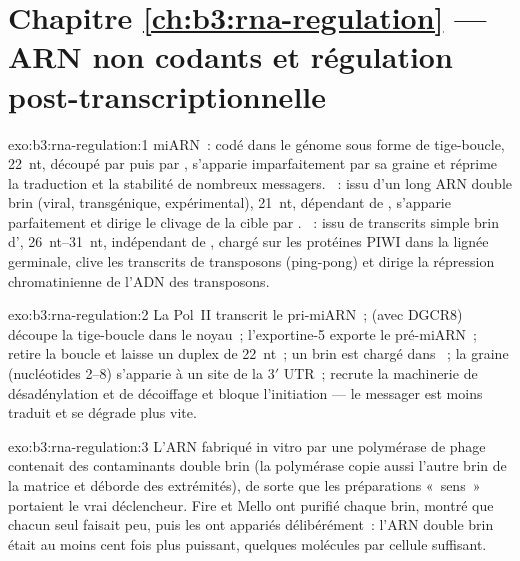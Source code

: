 \section*{Chapitre \ref{ch:b3:rna-regulation} --- ARN non codants et régulation post-transcriptionnelle}

\begin{solution}{exo:b3:rna-regulation:1}
miARN~: codé dans le génome sous forme de tige-boucle, \qty{22}{nt},
découpé par  puis par , s'apparie imparfaitement par sa
graine et réprime la traduction et la stabilité de nombreux messagers.
~: issu d'un long ARN double brin (viral, transgénique,
expérimental), \qty{21}{nt}, dépendant de , s'apparie parfaitement
et dirige le clivage de la cible par . ~: issu de
transcrits simple brin d', \qtyrange{26}{31}{nt},
indépendant de , chargé sur les protéines PIWI dans la lignée
germinale, clive les transcrits de transposons (ping-pong) et dirige la
répression chromatinienne de l'ADN des transposons.
\end{solution}

\begin{solution}{exo:b3:rna-regulation:2}
La Pol~II transcrit le pri-miARN~;  (avec DGCR8) découpe la
tige-boucle dans le noyau~; l'exportine-5 exporte le pré-miARN~; 
retire la boucle et laisse un duplex de \qty{22}{nt}~; un brin est
chargé dans ~; la graine (nucléotides 2--8) s'apparie à un
site de la 3$'$ UTR~;  recrute la machinerie de désadénylation
et de décoiffage et bloque l'initiation --- le messager est moins
traduit et se dégrade plus vite.
\end{solution}

\begin{solution}{exo:b3:rna-regulation:3}
L'ARN fabriqué in vitro par une polymérase de phage contenait des
contaminants double brin (la polymérase copie aussi l'autre brin de la
matrice et déborde des extrémités), de sorte que les préparations
«~sens~» portaient le vrai déclencheur. Fire et Mello ont purifié
chaque brin, montré que chacun seul faisait peu, puis les ont appariés
délibérément~: l'ARN double brin était au moins cent fois plus
puissant, quelques molécules par cellule suffisant.
\end{solution}

